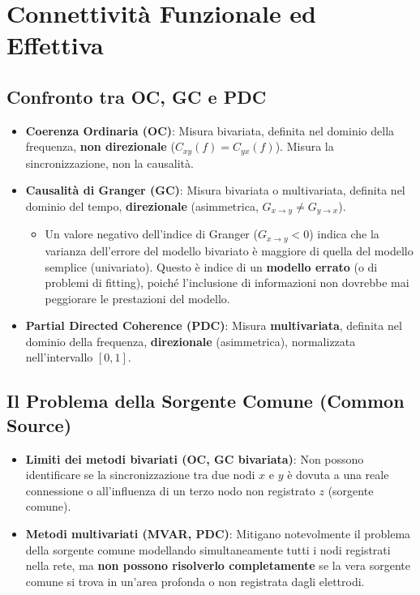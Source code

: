 \documentclass[10pt, letterpaper]{report}
\begin{document}
\chapter{Connettività Funzionale ed Effettiva}

\section{Confronto tra OC, GC e PDC}
\begin{itemize}
    \item \textbf{Coerenza Ordinaria (OC)}: Misura bivariata, definita nel dominio della frequenza, \textbf{non direzionale} (\(C_{xy}(f) = C_{yx}(f)\)). Misura la sincronizzazione, non la causalità.
    \item \textbf{Causalità di Granger (GC)}: Misura bivariata o multivariata, definita nel dominio del tempo, \textbf{direzionale} (asimmetrica, \(G_{x \to y} \neq G_{y \to x}\)).
    \begin{itemize}
        \item Un valore negativo dell'indice di Granger (\(G_{x \to y} < 0\)) indica che la varianza dell'errore del modello bivariato è maggiore di quella del modello semplice (univariato). Questo è indice di un \textbf{modello errato} (o di problemi di fitting), poiché l'inclusione di informazioni non dovrebbe mai peggiorare le prestazioni del modello.
    \end{itemize}
    \item \textbf{Partial Directed Coherence (PDC)}: Misura \textbf{multivariata}, definita nel dominio della frequenza, \textbf{direzionale} (asimmetrica), normalizzata nell'intervallo \([0, 1]\).
\end{itemize}

\section{Il Problema della Sorgente Comune (Common Source)}
\begin{itemize}
    \item \textbf{Limiti dei metodi bivariati (OC, GC bivariata)}: Non possono identificare se la sincronizzazione tra due nodi \(x\) e \(y\) è dovuta a una reale connessione o all'influenza di un terzo nodo non registrato \(z\) (sorgente comune).
    \item \textbf{Metodi multivariati (MVAR, PDC)}: Mitigano notevolmente il problema della sorgente comune modellando simultaneamente tutti i nodi registrati nella rete, ma \textbf{non possono risolverlo completamente} se la vera sorgente comune si trova in un'area profonda o non registrata dagli elettrodi.
\end{itemize}
\end{document}
